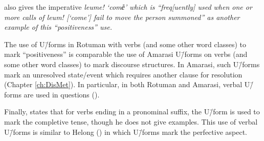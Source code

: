 \citet[95]{ch40} also gives the imperative \it{leume!} `come{\U}' which is
``freq[uently] used when one or more calls of \it{leum!} [`come{\M}']
fail to move the person summoned'' as another example of this ``positiveness'' use.

The use of U\=/forms in Rotuman with verbs (and some other word classes) to mark ``positiveness''
is comparable the use of Amarasi U\=/forms on verbs
(and some other word classes) to mark discourse structures.
In Amarasi, such U\=/forms mark an unresolved state/event
which requires another clause for resolution (Chapter \ref{ch:DisMet}).
In particular, in both Rotuman and Amarasi, verbal U\=/forms are used in questions ().

Finally, \citet[88]{ch40} states that for verbs ending in a pronominal suffix,
the U\=/form is used to mark the completive tense, though he does not give examples.
This use of verbal U\=/forms is similar to Helong ()
in which U\=/forms mark the perfective aspect.